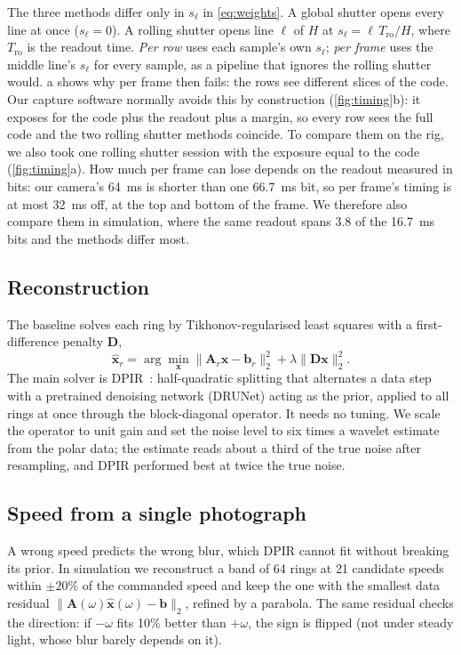 The three methods differ only in $s_\ell$ in \eqref{eq:weights}. A global shutter opens every line
at once ($s_\ell = 0$). A rolling shutter opens line $\ell$ of $H$ at $s_\ell = \ell\,T_\mathrm{ro}/H$,
where $T_\mathrm{ro}$ is the readout time. \emph{Per row} uses each sample's own $s_\ell$;
\emph{per frame} uses the middle line's $s_\ell$ for every sample, as a pipeline that ignores the
rolling shutter would. a shows why per frame then fails: the rows see different
slices of the code. Our capture software normally avoids this by construction (\cref{fig:timing}b): it exposes for the code plus the readout plus a margin, so every row sees the full code and the two rolling shutter methods coincide. To compare them on the rig, we also took one rolling shutter session with the exposure equal to the code (\cref{fig:timing}a). How much per frame can lose depends on the readout measured in bits: our camera's \SI{64}{ms} is shorter than one \SI{66.7}{ms} bit, so per frame's timing is at most \SI{32}{ms} off, at the top and bottom of the frame. We therefore also compare them in simulation, where the same readout spans 3.8 of the \SI{16.7}{ms} bits and the methods differ most. 

\subsection{Reconstruction}
\label{sec:recon}
The baseline solves each ring by Tikhonov-regularised least squares with a first-difference
penalty $\mathbf{D}$,
\begin{equation}
  \hat{\mathbf{x}}_r = \arg\min_{\mathbf{x}} \|\mathbf{A}_r\mathbf{x}-\mathbf{b}_r\|_2^2
  + \lambda\|\mathbf{D}\mathbf{x}\|_2^2 .
  \label{eq:tikhonov}
\end{equation}
The main solver is DPIR~\cite{zhang2022plug}: half-quadratic splitting that alternates a data step
with a pretrained denoising network (DRUNet) acting as the prior, applied to all rings at once
through the block-diagonal operator. It needs no tuning. We scale the operator to unit gain and set
the noise level to six times a wavelet estimate from the polar data; the estimate reads about a
third of the true noise after resampling, and DPIR performed best at twice the true noise.

\subsection{Speed from a single photograph}
\label{sec:speed}
A wrong speed predicts the wrong blur, which DPIR cannot fit without breaking its prior. In
simulation we reconstruct a band of 64 rings at 21 candidate speeds within $\pm20\%$ of the commanded
speed and keep the one with the smallest data residual
$\|\mathbf{A}(\omega)\hat{\mathbf{x}}(\omega)-\mathbf{b}\|_2$, refined by a parabola. The same residual
checks the direction: if $-\omega$ fits 10\% better than $+\omega$, the sign is flipped (not under
steady light, whose blur barely depends on it).

